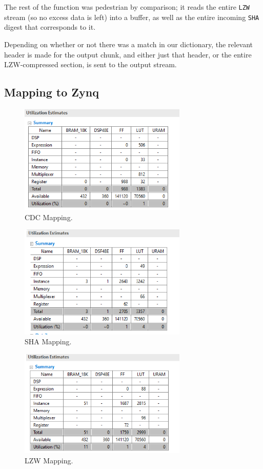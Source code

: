 \documentclass{article}
\begin{document}
\par
The rest of the function was pedestrian by comparison; it reads the entire \texttt{LZW} stream (so no excess data is left) into a buffer,
as well as the entire incoming \texttt{SHA} digest that corresponds to it.
\par
Depending on whether or not there was a match in our dictionary, the relevant header is made for the output chunk,
and either just that header, or the entire LZW-compressed section, is sent to the output stream.


\subsection{Mapping to Zynq}
\begin{figure}[hbt!]
  \includegraphics[width=80mm, scale=0.5]{rabin.png}
  \caption{CDC Mapping.}
  \label{fig:cdc_mapping}
\end{figure}

\begin{figure}[h!]
  \includegraphics[width=80mm, scale=0.5]{sha.png}
  \caption{SHA Mapping.}
  \label{fig:sha_mapping}
\end{figure}

\begin{figure}[h!]
  \includegraphics[width=80mm, scale=0.5]{lzw.png}
  \caption{LZW Mapping.}
  \label{fig:lzw_mapping}
\end{figure}
\end{document}
